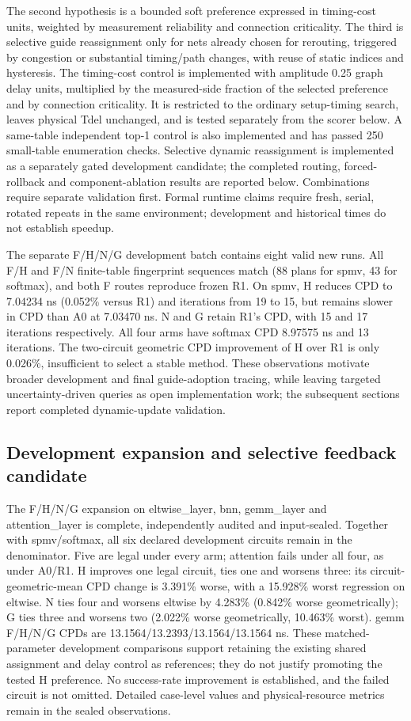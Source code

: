\documentclass[conference,10pt]{IEEEtran}
\begin{document}
The second hypothesis is a bounded soft preference expressed in timing-cost units, weighted by measurement reliability and connection criticality. The third is selective guide reassignment only for nets already chosen for rerouting, triggered by congestion or substantial timing/path changes, with reuse of static indices and hysteresis. The timing-cost control is implemented with amplitude 0.25 graph delay units, multiplied by the measured-side fraction of the selected preference and by connection criticality. It is restricted to the ordinary setup-timing search, leaves physical Tdel unchanged, and is tested separately from the scorer below. A same-table independent top-1 control is also implemented and has passed 250 small-table enumeration checks. Selective dynamic reassignment is implemented as a separately gated development candidate; the completed routing, forced-rollback and component-ablation results are reported below. Combinations require separate validation first. Formal runtime claims require fresh, serial, rotated repeats in the same environment; development and historical times do not establish speedup.

The separate F/H/N/G development batch contains eight valid new runs. All F/H and F/N finite-table fingerprint sequences match (88 plans for spmv, 43 for softmax), and both F routes reproduce frozen R1. On spmv, H reduces CPD to 7.04234 ns (0.052\% versus R1) and iterations from 19 to 15, but remains slower in CPD than A0 at 7.03470 ns. N and G retain R1's CPD, with 15 and 17 iterations respectively. All four arms have softmax CPD 8.97575 ns and 13 iterations. The two-circuit geometric CPD improvement of H over R1 is only 0.026\%, insufficient to select a stable method. These observations motivate broader development and final guide-adoption tracing, while leaving targeted uncertainty-driven queries as open implementation work; the subsequent sections report completed dynamic-update validation.



\subsection{Development expansion and selective feedback candidate}
The F/H/N/G expansion on eltwise\_layer, bnn, gemm\_layer and attention\_layer is complete, independently audited and input-sealed. Together with spmv/softmax, all six declared development circuits remain in the denominator. Five are legal under every arm; attention fails under all four, as under A0/R1. H improves one legal circuit, ties one and worsens three: its circuit-geometric-mean CPD change is 3.391\% worse, with a 15.928\% worst regression on eltwise. N ties four and worsens eltwise by 4.283\% (0.842\% worse geometrically); G ties three and worsens two (2.022\% worse geometrically, 10.463\% worst). gemm F/H/N/G CPDs are 13.1564/13.2393/13.1564/13.1564 ns. These matched-parameter development comparisons support retaining the existing shared assignment and delay control as references; they do not justify promoting the tested H preference. No success-rate improvement is established, and the failed circuit is not omitted. Detailed case-level values and physical-resource metrics remain in the sealed observations.
\end{document}
